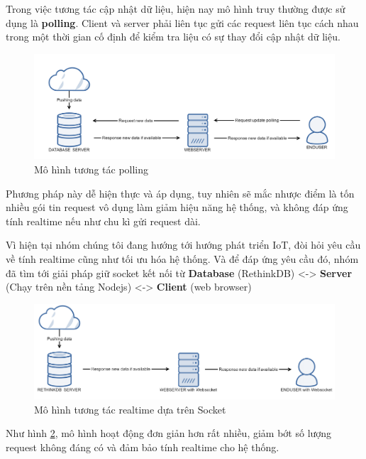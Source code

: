 Trong việc tương tác cập nhật dữ liệu, hiện nay mô hình truy thường được sử dụng là \textbf{polling}. Client và server phải liên tục gửi các request liên tục cách nhau trong một thời gian cố định để kiểm tra liệu có sự thay đổi cập nhật dữ liệu. 
\begin{figure}[H]
	\centering    
	\includegraphics[width=1.0\textwidth]{polling}
	\caption[Mô hình tương tác polling]{Mô hình tương tác polling}
	\label{fig: polling}
\end{figure}
Phương pháp này dễ hiện thực và áp dụng, tuy nhiên sẽ mắc nhược điểm là tốn nhiều gói tin request vô dụng làm giảm hiệu năng hệ thống, và không đáp ứng tính realtime nếu như chu kì gửi request dài.



Vì hiện tại nhóm chúng tôi đang hướng tới hướng phát triển IoT, đòi hỏi yêu cầu về tính realtime cũng như tối ưu hóa hệ thống. Và để đáp ứng yêu cầu đó, nhóm đã tìm tới giải pháp giữ socket kết nối từ \textbf{Database} (RethinkDB) <-> \textbf{Server} (Chạy trên nền tảng Nodejs) <-> \textbf{Client} (web browser)

\begin{figure}[H]
	\centering    
	\includegraphics[width=1.0\textwidth]{realtime}
	\caption[Mô hình tương tác realtime dựa trên Socket]{Mô hình tương tác realtime dựa trên Socket}
	\label{fig: realtime}
\end{figure}

Như hình \ref{fig: realtime}, mô hình hoạt động đơn giản hơn rất nhiều, giảm bớt số lượng request không đáng có và đảm bảo tính realtime cho hệ thống.

